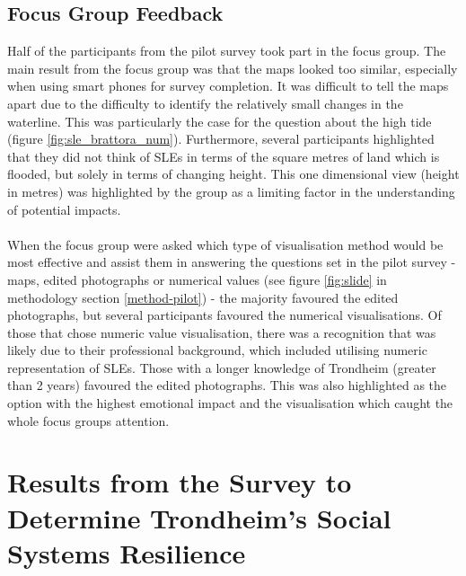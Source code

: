 \paragraph{}


\subsection{Focus Group Feedback}
Half of the participants from the pilot survey took part in the focus group. The main result from the focus group  was that the maps looked too similar, especially when using smart phones for survey completion. It was difficult to tell the maps apart due to the difficulty to identify the relatively small changes in the waterline. This was particularly the case for the question about the high tide (figure \ref{fig:sle_brattora_num}). Furthermore, several participants highlighted that they did not think of SLEs in terms of the square metres of land which is flooded, but solely in terms of changing height. This one dimensional view (height in metres) was highlighted by the group as a limiting factor in the understanding of potential impacts. 
\paragraph{}

When the focus group were asked which type of visualisation method would be most effective and assist them in answering the questions set in the pilot survey - maps, edited photographs or numerical values (see figure \ref{fig:slide} in methodology section \ref{method-pilot}) - the majority favoured the edited photographs, but several participants favoured the numerical visualisations. Of those that chose numeric value visualisation, there was a recognition that was likely due to their professional background, which included utilising numeric representation of SLEs. Those with a longer knowledge of Trondheim (greater than 2 years) favoured the edited photographs. This was also highlighted as the option with the highest emotional impact and the visualisation which caught the whole focus groups attention.
\paragraph{}






\section{Results from the Survey to Determine Trondheim's Social Systems Resilience}

